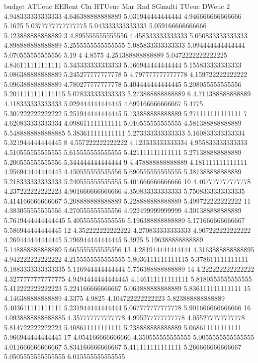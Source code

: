 budget ATUeuc EERent Clu HTUeuc Mar Rnd SGmulti TUeuc DWeuc
2 4.948333333333333 4.646388888888889 5.031944444444444 4.946666666666666 5.1625 5.0377777777777775 5.043333333333333 5.059166666666666 5.123888888888889
3 4.895555555555556 4.458333333333333 5.050833333333333 4.898888888888889 5.2555555555555555 5.085833333333333 5.094444444444444 5.070555555555556 5.19
4 4.8575 4.251388888888889 5.0472222222222225 4.846111111111111 5.343333333333333 5.166944444444444 5.155833333333333 5.086388888888889 5.245277777777778
5 4.797777777777778 4.159722222222222 5.096388888888889 4.780277777777778 5.404444444444445 5.208055555555556 5.2011111111111115 5.078333333333333 5.273888888888889
6 4.711388888888889 4.118333333333333 5.029444444444445 4.699166666666667 5.4775 5.307222222222222 5.251944444444445 5.133888888888889 5.271111111111111
7 4.620833333333334 4.098611111111111 5.010555555555555 4.581388888888889 5.5488888888888885 5.383611111111111 5.273333333333333 5.160833333333334 5.321944444444445
8 4.557222222222222 4.123333333333334 4.955833333333333 4.510555555555555 5.615555555555555 5.421111111111111 5.271388888888889 5.200555555555556 5.344444444444444
9 4.478888888888889 4.181111111111111 4.956944444444445 4.450555555555556 5.690555555555555 5.381388888888889 5.218333333333333 5.240555555555555 5.401666666666666
10 4.407777777777778 4.237222222222223 4.901666666666666 4.350833333333333 5.7508333333333335 5.414166666666667 5.208888888888889 5.228888888888889 5.499722222222222
11 4.383055555555556 4.270555555555556 4.922499999999999 4.301388888888889 5.7619444444444445 5.405555555555556 5.196388888888889 5.171666666666667 5.586944444444445
12 4.352222222222222 4.270833333333333 4.907222222222222 4.269444444444445 5.796944444444445 5.3925 5.196388888888889 5.148888888888889 5.665555555555556
13 4.281944444444444 4.3163888888888895 4.942222222222222 4.2155555555555555 5.8036111111111115 5.378611111111111 5.1883333333333335 5.116944444444444 5.756388888888889
14 4.222222222222222 4.3277777777777775 4.9494444444444445 4.146111111111111 5.8180555555555555 5.412222222222223 5.224166666666667 5.063888888888889 5.836111111111111
15 4.146388888888889 4.3375 4.9825 4.104722222222223 5.823888888888889 5.403611111111111 5.231944444444444 5.067777777777778 5.901666666666666
16 4.0938888888888885 4.357777777777778 4.995277777777778 4.055277777777778 5.814722222222223 5.408611111111111 5.238888888888889 5.068611111111111 5.966944444444445
17 4.054166666666666 4.350555555555555 5.0055555555555555 4.011666666666667 5.834166666666667 5.411111111111111 5.266666666666667 5.0505555555555555 6.015555555555555
